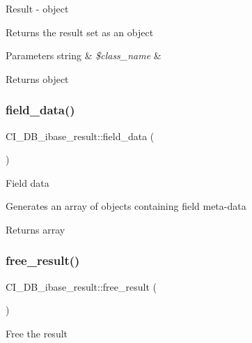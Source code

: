 Result -\/ object

Returns the result set as an object


\begin{DoxyParams}[1]{Parameters}
string & {\em \$class\+\_\+name} & \\
\hline
\end{DoxyParams}
\begin{DoxyReturn}{Returns}
object 
\end{DoxyReturn}
\mbox{\label{class_c_i___d_b__ibase__result_a7c2cad1426d265028ce91925d4370a2c}} 
\subsubsection{\texorpdfstring{field\+\_\+data()}{field\_data()}}
{\footnotesize\ttfamily C\+I\+\_\+\+D\+B\+\_\+ibase\+\_\+result\+::field\+\_\+data (\begin{DoxyParamCaption}{ }\end{DoxyParamCaption})}

Field data

Generates an array of objects containing field meta-\/data

\begin{DoxyReturn}{Returns}
array 
\end{DoxyReturn}
\mbox{\label{class_c_i___d_b__ibase__result_ad26a10f8908e3a7fcd705905c9547ecf}} 
\subsubsection{\texorpdfstring{free\+\_\+result()}{free\_result()}}
{\footnotesize\ttfamily C\+I\+\_\+\+D\+B\+\_\+ibase\+\_\+result\+::free\+\_\+result (\begin{DoxyParamCaption}{ }\end{DoxyParamCaption})}

Free the result

